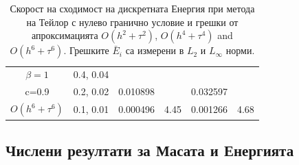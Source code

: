\documentclass{article}
\begin{document}
\begin{table}[ht]
\begin{tabular}{||c|l|ll|ll||}
    \hline
  $\beta=1$     &0.4, 0.04   &            &          &                  &      \\
      c=0.9                    &0.2, 0.02   &0.010898 &           & 0.032597      &       \\
     $O(h^6+ \tau^6)$ &0.1, 0.01 & 0.000496 &4.45 & 0.001266  & 4.68        \\
	   \hline
			\hline 
		\end{tabular}
		\caption{Скорост на сходимост на дискретната Енергия при метода на Тейлор с нулево гранично условие и грешки от апроксимацията $O(h^{2} + \tau^2 )$, $O(h^{4} + \tau^4 )$ and $O(h^{6} + \tau^6 )$. Грешките $\bar E_i$ са измерени в $L_2$ и $L_\infty$ норми.}
\label{tableB}
\end{table}

\subsection{Числени резултати за Масата и Енергията}
\end{document}
